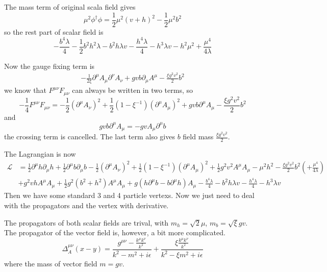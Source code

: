\documentclass{article}
\newcommand{\la}{\lambda}
\newcommand{\lag}{\mathcal{L}}
\newcommand{\da}{^{\dagger}}
\newcommand{\sm}{^{\mu}}
\newcommand{\smn}{^{\mu\nu}}
\newcommand{\Asquare}{A^{\mu}A_{\mu}}
\begin{document}
\begin{enumerate}[\bf 1.]
	The mass term of original scala field gives
	$$\mu^2\phi\da\phi=\frac{1}{2}\mu^2(v+h)^2-\frac{1}{2}\mu^2b^2$$
	so the rest part of scalar field is
	$$-\frac{b^4 \lambda }{4}-\frac{1}{2} b^2 h^2 \lambda -b^2 h \lambda  v-\frac{h^4 \lambda }{4}-h^3 \lambda  v-h^2 \mu ^2+\frac{\mu ^4}{4 \lambda }$$

	Now the gauge fixing term is
	\begin{align*}
	  -\frac{1}{2\xi}\partial\sm A_{\mu}\partial^{\nu}A_{\nu}+gvb\partial_{\mu}A^{\mu}-\frac{\xi g^2v^2}{2}b^2
	\end{align*}
	we know that $F\smn F_{\mu\nu}$ can always be written in two terms, so
	$$-\frac{1}{4}F\smn F_{\mu\nu}=-\frac{1}{2}(\partial^{\mu}A_{\nu})^2+\frac{1}{2}(1-\xi^{-1})(\partial\sm A_{\mu})^2+gvb\partial^{\mu}A_{\mu}-\frac{\xi g^2v^2}{2}b^2$$
	and $$gvb\partial^{\mu}A_{\mu}=-gvA_{\mu}\partial^{\mu}b$$
	the crossing term is cancelled. The last term also gives $b$ field mass $\frac{\xi g^2v^2}{2}$.

	The Lagrangian is now
	\begin{align*}
	  \lag&=\frac{1}{2}\partial\sm h\partial_{\mu}h+\frac{1}{2}\partial^{\mu}b\partial_{\mu}b-\frac{1}{2}(\partial^{\mu}A_{\nu})^2+\frac{1}{2}(1-\xi^{-1})(\partial\sm A_{\mu})^2+\frac{1}{2}g^2v^2\Asquare-\mu^2h^2-\frac{\xi g^2v^2}{2}b^2(+\frac{\mu^4}{4\la})\\&+g^2vh\Asquare+\frac{1}{2}g^2(b^2+h^2)\Asquare+g(h\partial\sm b-b\partial\sm h)A_{\mu} -\frac{b^4 \lambda }{4} -b^2 h \lambda  v-\frac{h^4 \lambda }{4}-h^3 \lambda  v
	\end{align*}
  Then we have some standard 3 and 4 particle vertexs. Now we just need to deal with the propagators and the vertex with derivative.

  The propagators of both scalar fields are trival, with $m_h=\sqrt{2}\mu$, $m_b=\sqrt{\xi}gv$. The propagator of the vector field is, however, a bit more complicated.  $$\Delta_A^{\mu\nu}(x-y)=\frac{g^{\mu\nu}-\frac{k^{\mu}k^{\nu}}{k^2}}{k^2-m^2+i\epsilon}+\frac{\xi\frac{k^{\mu}k^{\nu}}{k^2}}{k^2-\xi m^2+i\epsilon}$$
  where the mass of vector field $m=gv$.


\end{enumerate}
\end{document}
